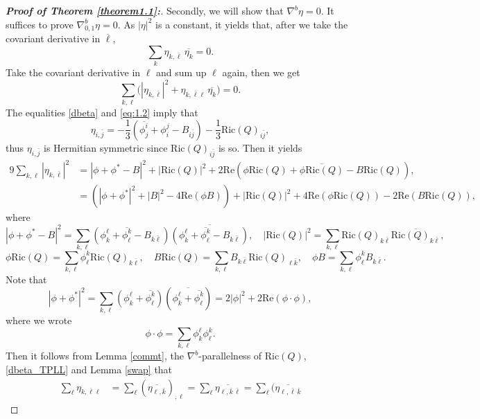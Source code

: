 \documentclass{amsart}
\numberwithin{equation}{section}
\theoremstyle{definition}
\renewcommand{\1}{\mathds{1}}
\renewcommand{\>}{\rightarrow}
\begin{document}
\begin{proof}[{\bf Proof of Theorem \ref{theorem1.1}:}]
Secondly, we will show that $\nabla^b \eta=0$. It suffices to prove $\nabla^b_{0,1}\eta=0$.
As $|\eta|^2$ is a constant, it yields that, after we take the covariant derivative in $\overline{\ell}$,
\[\sum_k \eta_{k,\bar{\ell}} \,\overline{\eta_k}=0.\]
Take the covariant derivative in $\ell$ and sum up $\ell$ again, then we get
\begin{equation}\label{eta_cst}
\sum_{k,\ell} \big( |\eta_{k,\bar{\ell}}|^2 + \eta_{k,\bar{\ell}\ell}\,\overline{\eta_{k}}  \big) =0.
\end{equation}
The equalities \eqref{dbeta} and \eqref{eq:1.2} imply that
\begin{equation}\label{dbeta_TPLL}
\eta_{i,\bar{j}}  =  -\frac{1}{3}( \overline{\phi_j^i} + \phi_i^j - B_{i\bar{j}})
- \frac{1}{3} \mathrm{Ric}(Q)_{i\bar{j}},
\end{equation}
thus $\eta_{i,\bar{j}}$ is Hermitian symmetric since $\mathrm{Ric}(Q)_{i\bar{j}}$ is so.
Then it yields
\[\begin{aligned}
 9 \sum_{k,\ell} |\eta_{k,\bar{\ell}}|^2 &= |\phi+\phi^*-B|^2 +  |\mathrm{Ric}(Q)|^2
+2 \mathrm{Re}\left(\phi \mathrm{Ric}(Q) + \overline{\phi \mathrm{Ric}(Q)} - B \mathrm{Ric}(Q)\right), \\
&= \left(|\phi + \phi^*|^2+|B|^2-4 \mathrm{Re}(\phi B)\right)
+  |\mathrm{Ric}(Q)|^2 + 4 \mathrm{Re} \left( \phi \mathrm{Ric}(Q) \right)- 2 \mathrm{Re} \left( B \mathrm{Ric}(Q) \right),
\end{aligned}\]
where
\[|\phi+\phi^*-B|^2 =\sum_{k,\ell}(\phi_k^\ell+\overline{\phi_\ell^k}-B_{k\bar{\ell}})\overline{(\phi_k^\ell+\overline{\phi_\ell^k}-B_{k\bar{\ell}})},
\quad |\mathrm{Ric}(Q)|^2=\sum_{k,\ell} \mathrm{Ric}(Q)_{k \bar{\ell}} \overline{ \mathrm{Ric}(Q)_{k \bar{\ell}}},\]
\[\phi\mathrm{Ric}(Q)=\sum_{k,\ell} \phi^k_\ell \mathrm{Ric}(Q)_{k \bar{\ell}}, \quad
B\mathrm{Ric}(Q) = \sum_{k,\ell} B_{k\bar{\ell}}\mathrm{Ric}(Q)_{\ell \bar{k}}, \quad \phi B = \sum_{k,\ell} \phi^k_{\ell} B_{k\bar{\ell}}.\]
Note that
\[|\phi + \phi^*|^2= \sum_{k,\ell}(\phi^\ell_k + \overline{ \phi^k_\ell} ) ( \overline{ \phi^\ell_k + \overline{\phi^k_\ell}} )
= 2|\phi|^2 + 2\mathrm{Re}( \phi \cdot \phi ),\]
where we wrote
\[ \phi \cdot \phi = \sum_{k, \ell} \phi_k^\ell \phi_\ell^k.\]
Then it follows from Lemma \ref{commt}, the $\nabla^b$-parallelness of $\mathrm{Ric}(Q)$, \eqref{dbeta_TPLL} and Lemma \ref{swap} that
\[\begin{aligned}
\sum_\ell \eta_{k,\bar{\ell} \ell} &= \sum_\ell \left( \overline{\eta_{\ell,\bar{k}}}\right)_{\!,\ell} = \sum_{\ell} \overline{\eta_{\ell,\bar{k}\,\bar{\ell}}}  = \sum_\ell  \big( \overline{\eta_{\ell, \bar{\ell}\,\bar{k}}
}
\end{aligned}\]
\end{proof}
\end{document}
